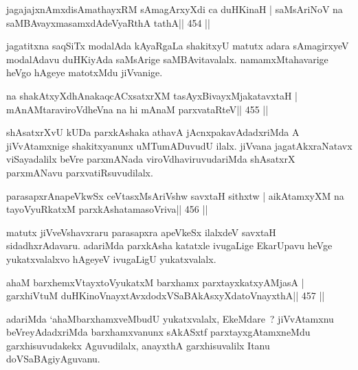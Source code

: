 \begin{shl}
jagajajxnAmxdisAmathayxRM sAmagArxyXdi ca duHKinaH |
saMsAriNoV na saMBAvayxmasamxdAdeVyaRthA tathA\hfill || 454 ||
\end{shl}

\begin{artha}
jagatitxna saqSiTx modalAda kAyaRgaLa  shakitxyU matutx adara sAmagirxyeV modalAdavu duHKiyAda saMsArige saMBAvitavalalx. namamxMtahavarige heVgo hAgeye matotxMdu jiVvanige.
\end{artha}

\begin{shl}
na shakAtxyXdhAnakaqcACxsatxrXM tasAyxBivayxMjakatavxtaH |
mAnAMtaraviroVdheVna na hi mAnaM parxvataRteV\hfill || 455 ||
\end{shl}

\begin{artha}
shAsatxrXvU kUDa parxkAshaka athavA jAcnxpakavAdadxriMda A jiVvAtamxnige shakitxyanunx uMTumADuvudU ilalx. jiVvana jagatAkxraNatavx viSayadalilx beVre parxmANada viroVdhaviruvudariMda shAsatxrX parxmANavu parxvatiRsuvudilalx.
\end{artha}




\begin{shl}
parasapxrAnapeVkwSx ceVtasxMsAriVshw savxtaH sithxtw |
aikAtamxyXM na tayoVyuRkatxM parxkAshatamasoVriva\hfill || 456 ||
\end{shl}

\begin{artha}
matutx jiVveVshavxraru parasapxra apeVkeSx ilalxdeV savxtaH sidadhxrAdavaru. adariMda parxkAsha katatxle ivugaLige EkarUpavu heVge yukatxvalalxvo hAgeyeV ivugaLigU yukatxvalalx.
\end{artha}


\begin{shl}
ahaM barxhemxVtayxtoV\s yukatxM barxhamx parxtayxkatxyA\s MjasA |
garxhiVtuM duHKinoV\s nayxtAvxdodxVSaBAkAsxyXdatoV\s nayxthA\hfill || 457 ||
\end{shl}

\begin{artha}
adariMda `ahaMbarxhamxveMbudU yukatxvalalx, EkeMdare~? jiVvAtamxnu beVreyAdadxriMda barxhamxvanunx sAkASxtf parxtayxgAtamxneMdu garxhisuvudakekx Aguvudilalx, anayxthA garxhisuvalilx Itanu doVSaBAgiyAguvanu.
\end{artha}



